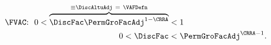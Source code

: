   \begin{equation}\label{eq:FVAC}
    \begin{split}
\text{{\FVAC}:~~}      0 < \overbrace{\DiscFac \PermGroFacAdj^{1-\CRRA} }^{\equiv \DiscAltuAdj~=~\text{\VAFDefn}}  & < 1 \phantom{\text{{\FVAC}:~~}}
      \\ 0 < \DiscFac  & < \PermGroFacAdj^{\CRRA-1} .
    \end{split}
  \end{equation}
